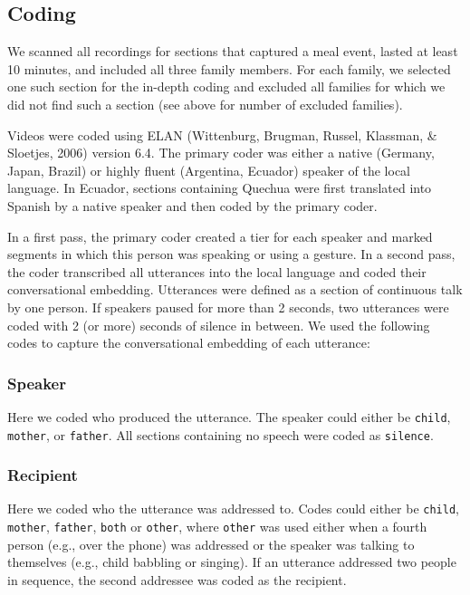 \documentclass[
  man,floatsintext]{apa6}
\begin{document}
\hypertarget{coding}{%
\subsection{Coding}\label{coding}}

We scanned all recordings for sections that captured a meal event, lasted at least 10 minutes, and included all three family members. For each family, we selected one such section for the in-depth coding and excluded all families for which we did not find such a section (see above for number of excluded families).

Videos were coded using ELAN (Wittenburg, Brugman, Russel, Klassman, \& Sloetjes, 2006) version 6.4. The primary coder was either a native (Germany, Japan, Brazil) or highly fluent (Argentina, Ecuador) speaker of the local language. In Ecuador, sections containing Quechua were first translated into Spanish by a native speaker and then coded by the primary coder.

In a first pass, the primary coder created a tier for each speaker and marked segments in which this person was speaking or using a gesture. In a second pass, the coder transcribed all utterances into the local language and coded their conversational embedding. Utterances were defined as a section of continuous talk by one person. If speakers paused for more than 2 seconds, two utterances were coded with 2 (or more) seconds of silence in between. We used the following codes to capture the conversational embedding of each utterance:

\hypertarget{speaker}{%
\subsubsection{Speaker}\label{speaker}}

Here we coded who produced the utterance. The speaker could either be \texttt{child}, \texttt{mother}, or \texttt{father}. All sections containing no speech were coded as \texttt{silence}.

\hypertarget{recipient}{%
\subsubsection{Recipient}\label{recipient}}

Here we coded who the utterance was addressed to. Codes could either be \texttt{child}, \texttt{mother}, \texttt{father}, \texttt{both} or \texttt{other}, where \texttt{other} was used either when a fourth person (e.g., over the phone) was addressed or the speaker was talking to themselves (e.g., child babbling or singing). If an utterance addressed two people in sequence, the second addressee was coded as the recipient.
\end{document}
